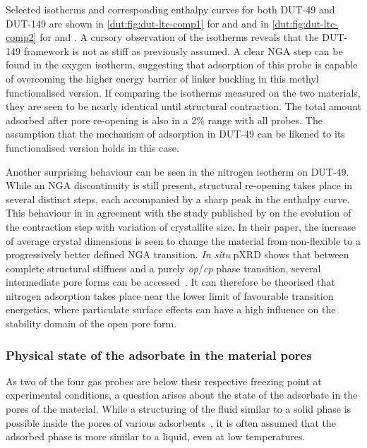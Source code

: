 Selected isotherms and corresponding enthalpy curves for both 
DUT-49 and DUT-149 are shown in \autoref{dut:fig:dut-ltc-comp1}
for  and  and in \autoref{dut:fig:dut-ltc-comp2}
for  and . A cursory observation of the isotherms
reveals that the DUT-149 framework is not as stiff as 
previously assumed. A clear \gls{NGA} step can be found in the 
oxygen isotherm, suggesting that adsorption of this probe is capable 
of overcoming the higher energy barrier of linker buckling in 
this methyl functionalised version.
If comparing the isotherms measured on the two materials, they
are seen to be nearly identical until structural contraction.
The total amount adsorbed after pore re-opening is also in a 
2\% range with all probes. The assumption that the mechanism 
of adsorption in DUT-49 can be likened to its functionalised
version holds in this case.

Another surprising behaviour
can be seen in the nitrogen isotherm on DUT-49. While an \gls{NGA}
discontinuity is still present, structural re-opening takes
place in several distinct steps, each accompanied by a sharp 
peak in the enthalpy curve. This behaviour in in
agreement with the study published by 
 \citet{krauseEffectCrystalliteSize2018}
on the evolution of the contraction step with variation of 
crystallite size. In their paper, the increase of average 
crystal dimensions is seen to change the material from non-flexible 
to a progressively better defined \gls{NGA} transition. \textit{In situ} 
\gls{pXRD} shows that between complete structural stiffness and a 
purely \textit{op}/\textit{cp} phase transition, several intermediate 
pore forms can be accessed~\cite{krauseEffectCrystalliteSize2018}. 
It can therefore be theorised that 
nitrogen adsorption takes place near the lower limit of 
favourable transition energetics, where particulate surface 
effects can have a high influence on the stability domain of
the open pore form.

\subsubsection{Physical state of the adsorbate in the material pores}

As two of the four gas probes are below their respective freezing point
at experimental conditions, a question arises about the state of
the adsorbate in the pores of the material. While a structuring of
the fluid similar to a solid phase is possible inside the 
pores of various adsorbents~\cite{llewellynAdsorptionMFItypeZeolites1993a},
it is often assumed that the adsorbed phase is more similar to a liquid,
even at low temperatures.

